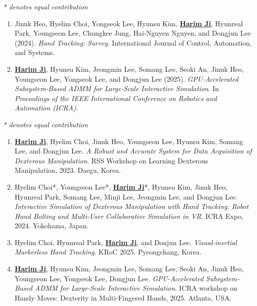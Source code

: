 \documentclass[9pt]{developercv} %
\begin{document}
\textit{* denotes equal contribution}
\begin{enumerate}
    \item Jinuk Heo, Hyelim Choi, Yongseok Lee, Hyunsu Kim, \underline{\textbf{Harim Ji}}, Hyunreal Park, Youngseon Lee, Chungkee Jung, Hai-Nguyen Nguyen, and Dongjun Lee (2024). \textit{Hand Tracking: Survey}. International Journal of Control, Automation, and Systems.
    \item \underline{\textbf{Harim Ji}}, Hyunsu Kim, Jeongmin Lee, Somang Lee, Seoki An, Jinuk Heo, Youngseon Lee, Yongseok Lee, and Dongjun Lee (2025). \textit{GPU-Accelerated Subsystem-Based ADMM for Large-Scale Interactive Simulation}. In \textit{Proceedings of the IEEE International Conference on Robotics and Automation (ICRA)}.
\end{enumerate}


\textit{ * denotes equal contribution}
\begin{enumerate}
    \item \underline{\textbf{Harim Ji}}, Hyelim Choi, Jinuk Heo, Youngseon Lee, Hyunsu Kim, Somang Lee, and Dongjun Lee. \textit{A Robust and Accurate System for Data Acquisition of Dexterous Manipulation}. RSS Workshop on Learning Dexterous Manipulation, 2023. Daegu, Korea.
    \item Hyelim Choi*, Youngseon Lee*, \underline{\textbf{Harim Ji}}*, Hyunsu Kim, Jinuk Heo, Hyunreal Park, Somang Lee, Minji Lee, Jeongmin Lee, and Dongjun Lee. \textit{Interactive Simulation of Dexterous Manipulation with Hand Tracking: Robot Hand Bolting and Multi-User Collaborative Simulation in VR}. ICRA Expo, 2024. Yokohama, Japan.   
    \item Hyelim Choi, Hyunreal Park, \underline{\textbf{Harim Ji}}, and Donjun Lee. \textit{Visual-inertial Markerless Hand Tracking}. KRoC 2025. Pyeongchang, Korea.
    \item \underline{\textbf{Harim Ji}}, Hyunsu Kim, Jeongmin Lee, Somang Lee, Seoki An, Jinuk Heo, Youngseon Lee, Yongseok Lee, Dongjun Lee. \textit{GPU-Accelerated Subsystem-Based ADMM for Large-Scale Interactive Simulation}. ICRA workshop on Handy Moves: Dexterity in Multi-Fingered Hands, 2025. Atlanta, USA.
\end{enumerate}
\end{document}
